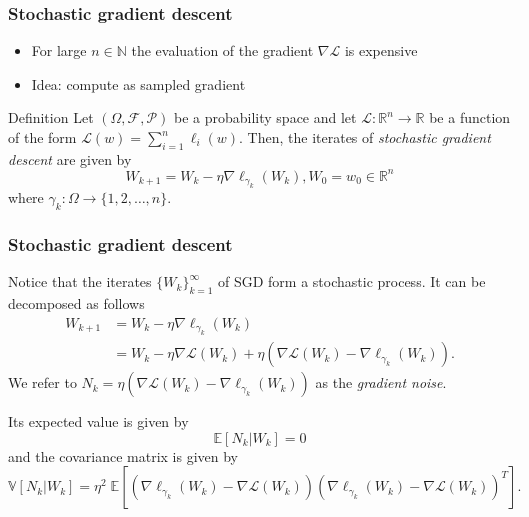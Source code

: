 \documentclass[17pt,institute=e10]{tuhh_presentation}
\newcommand{\R}{\mathbb{R}}
\newcommand{\Lo}{\mathcal{L} : \R^n \rightarrow \R}
\newcommand{\CL}{\mathcal{L}}
\newcommand{\E}[1]{\mathbb{E}\left[{#1} \right]}
\newcommand{\V}[1]{\mathbb{V}\left[{#1} \right]}
\begin{document}
\begin{frame}[fragile]
  \frametitle{Stochastic gradient descent}
  \begin{itemize}
    \item For large $n \in \mathbb{N}$ the evaluation of the gradient $\nabla \CL$ is expensive
    \item Idea: compute as sampled gradient
  \end{itemize}
  \begin{block}{Definition}
    Let $(\Omega, \mathcal{F}, \mathcal{P})$ be a probability space and let $\Lo$ be a function of the form $\CL (w) = \sum_{i=1}^n \ell_i(w)$.
    Then, the iterates of \emph{stochastic gradient descent} are given by
    \begin{equation*}
      W_{k+1} = W_k - \eta \nabla \ell_{\gamma_k} (W_k), W_0 = w_0 \in \mathbb{R}^n
    \end{equation*}
    where $\gamma_k : \Omega \rightarrow \{1,2,\dots,n\}$. 
  \end{block}
  
\end{frame}

\begin{frame}[fragile]
  \frametitle{Stochastic gradient descent}
  Notice that the iterates $\{W_k\}_{k=1}^\infty$ of SGD form a stochastic process.
  It can be decomposed as follows
  \begin{align*}
    W_{k+1} &= W_k - \eta \nabla \ell_{\gamma_k} (W_k) \\
    &= W_k - \eta \nabla \CL(W_k) + \eta \left(\nabla \CL(W_k) - \nabla \ell_{\gamma_k} (W_k) \right).
  \end{align*}
  We refer to $N_k = \eta \left(\nabla \CL(W_k) - \nabla \ell_{\gamma_k} (W_k) \right)$ as the \emph{\textcolor{purple-pontifex}{gradient noise}}.

  Its expected value is given by
  \begin{equation*}
    \E{N_k|W_k} = 0
  \end{equation*}
  and the \textcolor{purple-pontifex}{covariance matrix} is given by
  \begin{equation*}
    \V{N_k|W_k} = \eta^2 \; \E{\left(\nabla \ell_{\gamma_k}(W_k) - \nabla \CL(W_k)\right)\left(\nabla \ell_{\gamma_k}(W_k) - \nabla \CL(W_k)\right)^T}.
  \end{equation*}
  
\end{frame}
\end{document}

